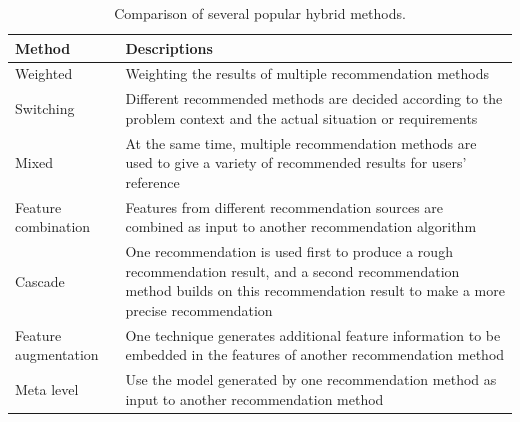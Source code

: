 \begin{table}[h]
\centering
\caption{Comparison of several popular hybrid methods. \parencite{ZHANG2024123876}}
\label{tab:hybrid_methods}
\begin{tabular}{>{\raggedright\arraybackslash}p{3cm} >{\raggedright\arraybackslash}p{9cm}}
\toprule
\textbf{Method} & \textbf{Descriptions} \\
\midrule
Weighted & Weighting the results of multiple recommendation methods \\
\addlinespace
Switching & Different recommended methods are decided according to the problem context and the actual situation or requirements \\
\addlinespace
Mixed & At the same time, multiple recommendation methods are used to give a variety of recommended results for users' reference \\
\addlinespace
Feature combination & Features from different recommendation sources are combined as input to another recommendation algorithm \\
\addlinespace
Cascade & One recommendation is used first to produce a rough recommendation result, and a second recommendation method builds on this recommendation result to make a more precise recommendation \\
\addlinespace
Feature augmentation & One technique generates additional feature information to be embedded in the features of another recommendation method \\
\addlinespace
Meta level & Use the model generated by one recommendation method as input to another recommendation method \\
\bottomrule
\end{tabular}
\end{table}